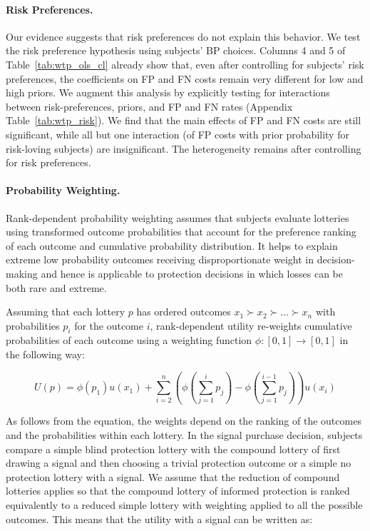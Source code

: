 \documentclass[12pt,a4paper]{article}
\begin{document}
\paragraph{Risk Preferences.} Our evidence suggests that risk preferences do not explain this behavior. We test the risk preference hypothesis using subjects' BP choices. Columns 4 and 5 of Table~\ref{tab:wtp_ols_cl} already show that, even after controlling for subjects' risk preferences, the coefficients on FP and FN costs remain very different for low and high priors.  We augment this analysis by explicitly testing for interactions between risk-preferences, priors, and FP and FN rates (Appendix Table~\ref{tab:wtp_risk}). We find that the main effects of FP and FN costs are still significant, while all but one interaction (of FP costs with prior probability for risk-loving subjects) are insignificant. The heterogeneity remains after controlling for risk preferences.

\paragraph{Probability Weighting.} Rank-dependent probability weighting assumes that subjects evaluate lotteries using transformed outcome probabilities that account for the preference ranking of each outcome and cumulative probability distribution.  It helps to explain extreme low probability outcomes receiving disproportionate weight in decision-making \citep{quiggin_theory_1982} and hence is applicable to protection decisions in which losses can be both rare and extreme.

Assuming that each lottery $p$ has ordered outcomes $x_1\succ x_2 \succ...\succ x_n$ with probabilities $p_i$ for the outcome $i$, rank-dependent utility re-weights cumulative probabilities of each outcome using a weighting function $\phi:[0,1]\to[0,1]$ in the following way:

\[U(p) = \phi(p_1)u(x_1)+\sum_{i=2}^n \left(\phi\left(\sum_{j=1}^i p_j\right)-\phi\left(\sum_{j=1}^{i-1}p_j\right) \right)u(x_i) \]


As follows from the equation, the weights depend on the ranking of the outcomes and the probabilities within each lottery. In the signal purchase decision,  subjects compare a simple blind protection lottery with the compound lottery of first drawing a signal and then choosing a trivial protection outcome or a simple no protection lottery with a signal. We assume that the reduction of compound lotteries applies so that the compound lottery of informed protection is ranked equivalently to a reduced simple lottery with weighting applied to all the possible outcomes. This means that the utility with a signal can be written as:
\end{document}
